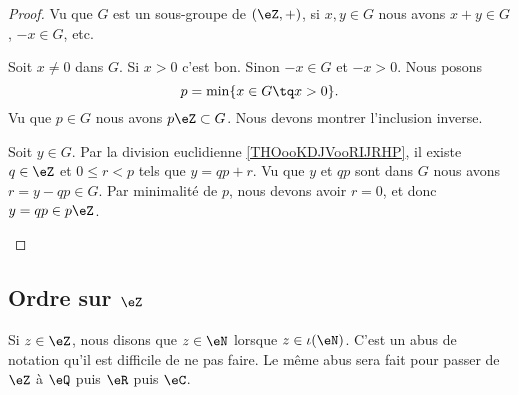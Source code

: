 \begin{proof}
	Vu que \( G\) est un sous-groupe de \( (\eZ,+)\), si \( x,y\in G\) nous avons \( x+y\in G\), \( -x\in G\), etc.
	\begin{subproof}
		Soit \( x\neq 0\) dans \( G\). Si \( x>0\) c'est bon. Sinon \( -x\in G\) et \( -x>0\).
		Nous posons
		\begin{equation}
			p=\min\{ x\in G\tq x>0 \}.
		\end{equation}
		Vu que \( p\in G\) nous avons \( p\eZ\subset G\). Nous devons montrer l'inclusion inverse.

		Soit \( y\in G\). Par la division euclidienne \ref{THOooKDJVooRIJRHP}, il existe \( q\in \eZ\) et \( 0\leq r<p\) tels que \( y=qp+r\). Vu que \( y\) et \( qp\) sont dans \( G\) nous avons \( r=y-qp\in G\). Par minimalité de \( p\), nous devons avoir \( r=0\), et donc \( y=qp\in p\eZ\).
	\end{subproof}
\end{proof}

\subsection{Ordre sur \( \eZ\)}
\label{SUBooEntiersRelatifsOrdre}

\begin{normaltext}	\label{NORMooNotationInclusionEntiers}
	Si \( z\in \eZ\), nous disons que \( z\in \eN\) lorsque \( z\in \iota(\eN)\). C'est un abus de notation qu'il est difficile de ne pas faire. Le même abus sera fait pour passer de \( \eZ\) à \( \eQ\) puis \( \eR\) puis \( \eC\).
\end{normaltext}


